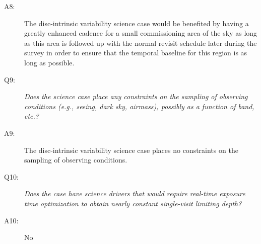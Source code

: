 \begin{description}
\item[A8:] The disc-intrinsic variability science case would be benefited by having a
greatly enhanced cadence for a small commissioning area of the sky as long as this area
is followed up with the normal revisit schedule later during the survey in order to
ensure that the temporal baseline for this region is as long as possible.

\item[Q9:] {\it Does the science case place any constraints on the
sampling of observing conditions (e.g., seeing, dark sky, airmass),
possibly as a function of band, etc.?}

\item[A9:] The disc-intrinsic variability science case places no constraints on
the sampling of observing conditions.

\item[Q10:] {\it Does the case have science drivers that would require
real-time exposure time optimization to obtain nearly constant
single-visit limiting depth?}

\item[A10:] No

\end{description}


\navigationbar
